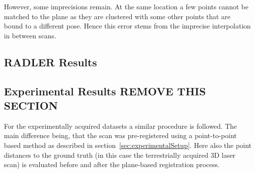 However, some imprecisions remain. 
At the same location a few points cannot be matched to the plane as they are clustered with some other points that are bound to a different pose. 
Hence this error stems from the imprecise interpolation in between scans. 

\subsection{RADLER Results}

\subsection{Experimental Results REMOVE THIS SECTION}

For the experimentally acquired datasets a similar procedure is followed. 
The main difference being, that the scan was pre-registered using a point-to-point based method as described in section~\ref{sec:experimentalSetup}. 
Here also the point distances to the ground truth (in this case the terrestrially acquired 3D laser scan) is evaluated before and after the plane-based registration process. 

